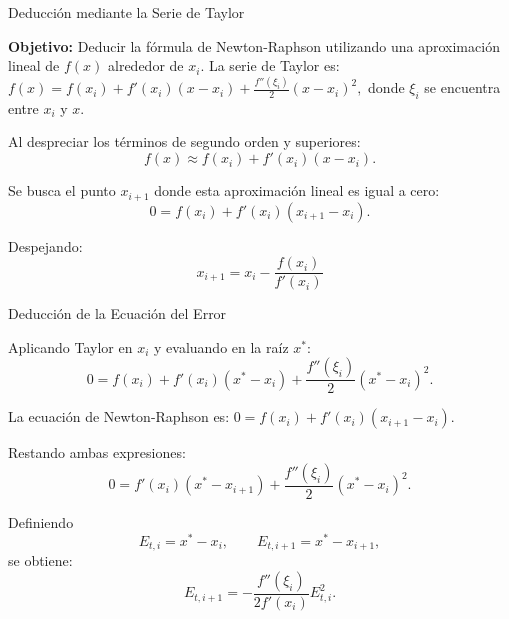 \documentclass[../../main.tex]{subfiles}
\begin{document}

\begin{frame}{Deducción mediante la Serie de Taylor}

\textbf{Objetivo:}
Deducir la fórmula de Newton-Raphson utilizando una aproximación
lineal de \(f(x)\) alrededor de \(x_i\).
La serie de Taylor es:
\(
f(x)
=
f(x_i)+f'(x_i)(x-x_i)
+\frac{f''(\xi_i)}{2}(x-x_i)^2,
\)
donde \(\xi_i\) se encuentra entre \(x_i\) y \(x\).

Al despreciar los términos de segundo orden y superiores:
\[
f(x)\approx f(x_i)+f'(x_i)(x-x_i).
\]

Se busca el punto \(x_{i+1}\) donde esta aproximación lineal
es igual a cero:
\[
0=f(x_i)+f'(x_i)(x_{i+1}-x_i).
\]

Despejando:
\[
\boxed{
x_{i+1}
=
x_i-\frac{f(x_i)}{f'(x_i)}
}
\]

\end{frame}



\begin{frame}{Deducción de la Ecuación del Error}

Aplicando Taylor en \(x_i\) y evaluando en la raíz \(x^*\):
\[
0
=
f(x_i)+f'(x_i)(x^*-x_i)
+\frac{f''(\xi_i)}{2}(x^*-x_i)^2.
\]

La ecuación de Newton-Raphson es:
\(
0
=
f(x_i)+f'(x_i)(x_{i+1}-x_i).
\)

Restando ambas expresiones:
\[
0
=
f'(x_i)(x^*-x_{i+1})
+\frac{f''(\xi_i)}{2}(x^*-x_i)^2.
\]

Definiendo
\[
E_{t,i}=x^*-x_i,
\qquad
E_{t,i+1}=x^*-x_{i+1},
\]
se obtiene:
\[
E_{t,i+1}
=
-\frac{f''(\xi_i)}{2f'(x_i)}E_{t,i}^2.
\]

\end{frame}


\end{document}
